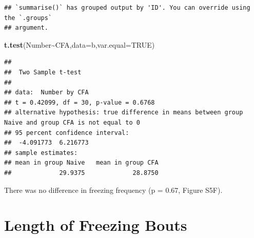 \documentclass[
]{book}
\newenvironment{Shaded}{\begin{snugshade}}{\end{snugshade}}
\newcommand{\AttributeTok}[1]{\textcolor[rgb]{0.13,0.29,0.53}{#1}}
\newcommand{\ConstantTok}[1]{\textcolor[rgb]{0.56,0.35,0.01}{#1}}
\newcommand{\FunctionTok}[1]{\textcolor[rgb]{0.13,0.29,0.53}{\textbf{#1}}}
\newcommand{\NormalTok}[1]{#1}
\newcommand{\OtherTok}[1]{\textcolor[rgb]{0.56,0.35,0.01}{#1}}
\newcommand{\SpecialCharTok}[1]{\textcolor[rgb]{0.81,0.36,0.00}{\textbf{#1}}}
\newcommand{\StringTok}[1]{\textcolor[rgb]{0.31,0.60,0.02}{#1}}
\begin{document}
\begin{verbatim}
## `summarise()` has grouped output by 'ID'. You can override using the `.groups`
## argument.
\end{verbatim}

\begin{Shaded}
\begin{Highlighting}[]
\FunctionTok{t.test}\NormalTok{(Number}\SpecialCharTok{\textasciitilde{}}\NormalTok{CFA,}\AttributeTok{data=}\NormalTok{b,}\AttributeTok{var.equal=}\ConstantTok{TRUE}\NormalTok{)}
\end{Highlighting}
\end{Shaded}

\begin{verbatim}
## 
##  Two Sample t-test
## 
## data:  Number by CFA
## t = 0.42099, df = 30, p-value = 0.6768
## alternative hypothesis: true difference in means between group Naive and group CFA is not equal to 0
## 95 percent confidence interval:
##  -4.091773  6.216773
## sample estimates:
## mean in group Naive   mean in group CFA 
##             29.9375             28.8750
\end{verbatim}

There was no difference in freezing frequency (p = 0.67, Figure S5F).

\section*{Length of Freezing Bouts}\label{length-of-freezing-bouts}

\begin{Shaded}
\end{Shaded}
\end{document}
